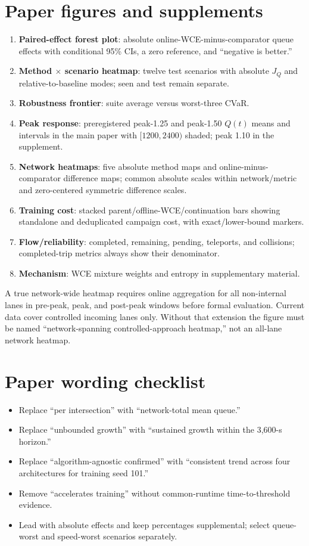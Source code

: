 \section{Paper figures and supplements}
\begin{enumerate}
  \item \textbf{Paired-effect forest plot}: absolute online-WCE-minus-comparator queue effects with conditional 95\% CIs, a zero reference, and “negative is better.”
  \item \textbf{Method $\times$ scenario heatmap}: twelve test scenarios with absolute $J_Q$ and relative-to-baseline modes; seen and test remain separate.
  \item \textbf{Robustness frontier}: suite average versus worst-three CVaR.
  \item \textbf{Peak response}: preregistered peak-1.25 and peak-1.50 $Q(t)$ means and intervals in the main paper with $[1200,2400)$ shaded; peak 1.10 in the supplement.
  \item \textbf{Network heatmaps}: five absolute method maps and online-minus-comparator difference maps; common absolute scales within network/metric and zero-centered symmetric difference scales.
  \item \textbf{Training cost}: stacked parent/offline-WCE/continuation bars showing standalone and deduplicated campaign cost, with exact/lower-bound markers.
  \item \textbf{Flow/reliability}: completed, remaining, pending, teleports, and collisions; completed-trip metrics always show their denominator.
  \item \textbf{Mechanism}: WCE mixture weights and entropy in supplementary material.
\end{enumerate}

A true network-wide heatmap requires online aggregation for all non-internal lanes in pre-peak, peak, and post-peak windows before formal evaluation. Current data cover controlled incoming lanes only. Without that extension the figure must be named “network-spanning controlled-approach heatmap,” not an all-lane network heatmap.

\section{Paper wording checklist}
\begin{itemize}
  \item Replace “per intersection” with “network-total mean queue.”
  \item Replace “unbounded growth” with “sustained growth within the 3,600-s horizon.”
  \item Replace “algorithm-agnostic confirmed” with “consistent trend across four architectures for training seed 101.”
  \item Remove “accelerates training” without common-runtime time-to-threshold evidence.
  \item Lead with absolute effects and keep percentages supplemental; select queue-worst and speed-worst scenarios separately.
\end{itemize}
